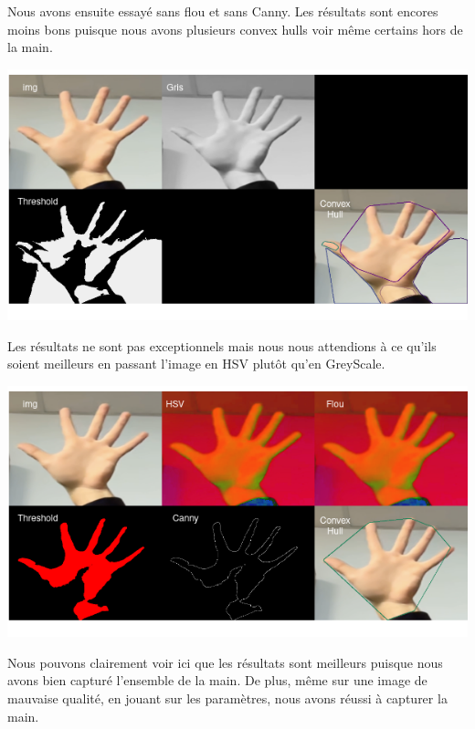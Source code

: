 \documentclass[11pt]{article}
\begin{document}
Nous avons ensuite essayé sans flou et sans Canny. Les résultats sont encores moins bons puisque nous avons plusieurs convex hulls voir même certains hors de la main. \bigbreak

\begin{center}
    \includegraphics[width=\textwidth]{images/pre_ttt_3.png}
\end{center}
\bigbreak

Les résultats ne sont pas exceptionnels mais nous nous attendions à ce qu'ils soient meilleurs en passant l'image en HSV plutôt qu'en GreyScale.  \bigbreak

\begin{center}
    \includegraphics[width=\textwidth]{images/pre_ttt_4.png}
\end{center}
\bigbreak

Nous pouvons clairement voir ici que les résultats sont meilleurs puisque nous avons bien capturé l'ensemble de la main. De plus, même sur une image de mauvaise qualité, en jouant sur les paramètres, nous avons réussi à capturer la main. \bigbreak
\end{document}
